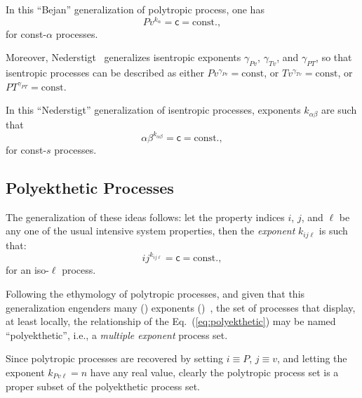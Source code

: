     In this ``Bejan'' generalization of polytropic process, one has
    \begin{equation}
        Pv^{k_{\alpha}} = \mathsf{c} = \mbox{const.},
        \label{eq:gen.Bejan}
    \end{equation}
    \noindent for const-$\alpha$ processes.

    Moreover,  Nederstigt~\cite{2017-NederstigtP-TUDelft}   generalizes   isentropic   exponents
    $\gamma_{Pv}$, $\gamma_{Tv}$,  and  $\gamma_{PT}$,  so  that  isentropic  processes  can  be
    described as either $Pv^{\gamma_{Pv}} = \mbox{const}$, or $Tv^{\gamma_{Tv}} = \mbox{const}$,
    or $PT^{\gamma_{PT}} = \mbox{const}$.

    In this ``Nederstigt'' generalization of isentropic processes,  exponents  $k_{\alpha\beta}$
    are such that
    \begin{equation}
        \alpha\beta^{k_{\alpha\beta}} = \mathsf{c} = \mbox{const.},
        \label{eq:gen.Nederstigt}
    \end{equation}
    \noindent for const-$s$ processes.

    \subsection{Polyekthetic Processes}

    The generalization of these ideas follows: let the property indices $i$, $j$, and $\ell$  be
    any one of the usual intensive system properties, then the \emph{exponent}  $k_{ij\ell}$  is
    such that:
    \begin{equation}
        ij^{k_{ij\ell}} = \mathsf{c} = \mbox{const.},
        \label{eq:polyekthetic}
    \end{equation}
    \noindent for an iso-$\ell$ process.

    Following the ethymology  of  polytropic  processes,  and  given  that  this  generalization
    engenders                  many                  ()                   exponents
    ()~\cite{1997-ManiatoglouMPF-Porto}, the set of processes that  display,  at
    least  locally,  the  relationship  of  the   Eq.~(\ref{eq:polyekthetic})   may   be   named
    ``polyekthetic'', i.e., a \emph{multiple exponent} process set.

    Since polytropic processes are recovered by setting $i \equiv P$, $j \equiv v$, and  letting
    the exponent $k_{Pv\ell} = n$ have any real value, clearly the polytropic process set  is  a
    proper subset of the polyekthetic process set.


